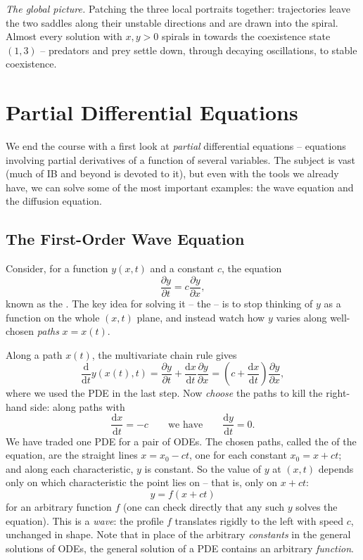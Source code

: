 \begin{example}
	\emph{The global picture.} Patching the three local portraits together: trajectories leave the two saddles along their unstable directions and are drawn into the spiral. Almost every solution with $x, y > 0$ spirals in towards the coexistence state $(1, 3)$ -- predators and prey settle down, through decaying oscillations, to stable coexistence.
\end{example}

\section{Partial Differential Equations}

We end the course with a first look at \emph{partial} differential equations -- equations involving partial derivatives of a function of several variables. The subject is vast (much of IB and beyond is devoted to it), but even with the tools we already have, we can solve some of the most important examples: the wave equation and the diffusion equation.

\subsection{The First-Order Wave Equation}

Consider, for a function $y(x, t)$ and a constant $c$, the equation
$$
\frac{\partial y}{\partial t} = c \frac{\partial y}{\partial x},
$$
known as the . The key idea for solving it -- the  -- is to stop thinking of $y$ as a function on the whole $(x, t)$ plane, and instead watch how $y$ varies along well-chosen \emph{paths} $x = x(t)$.

Along a path $x(t)$, the multivariate chain rule gives
$$
\frac{\mathrm{d}}{\mathrm{d}t} y(x(t), t) = \frac{\partial y}{\partial t} + \frac{\mathrm{d}x}{\mathrm{d}t}\frac{\partial y}{\partial x} = \left(c + \frac{\mathrm{d}x}{\mathrm{d}t}\right)\frac{\partial y}{\partial x},
$$
where we used the PDE in the last step. Now \emph{choose} the paths to kill the right-hand side: along paths with
$$
\frac{\mathrm{d}x}{\mathrm{d}t} = -c \qquad \text{we have} \qquad \frac{\mathrm{d}y}{\mathrm{d}t} = 0.
$$
We have traded one PDE for a pair of ODEs. The chosen paths, called the  of the equation, are the straight lines $x = x_0 - ct$, one for each constant $x_0 = x + ct$; and along each characteristic, $y$ is constant. So the value of $y$ at $(x,t)$ depends only on which characteristic the point lies on -- that is, only on $x + ct$:
$$
y = f(x + ct)
$$
for an arbitrary function $f$ (one can check directly that any such $y$ solves the equation). This is a \emph{wave}: the profile $f$ translates rigidly to the left with speed $c$, unchanged in shape. Note that in place of the arbitrary \emph{constants} in the general solutions of ODEs, the general solution of a PDE contains an arbitrary \emph{function}.

